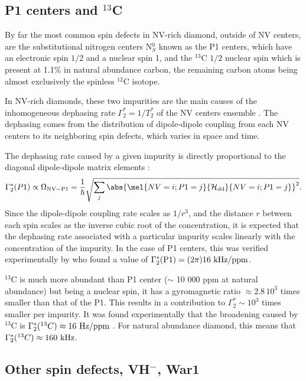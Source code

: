 \documentclass[a4paper]{report}
\begin{document}
\subsection{P1 centers and $^{13}$C}
By far the most common spin defects in NV-rich diamond, outside of NV centers, are the substitutional nitrogen centers N$^0_S$ known as the P1 centers, which have an electronic spin $1/2$ and a nuclear spin 1, and the $^13$C $1/2$ nuclear spin which is present at 1.1\% in natural abundance carbon, the remaining carbon atoms being almost exclusively the spinless $^12$C isotope. 

In NV-rich diamonds, these two impurities are the main causes of the inhomogeneous dephasing rate $\Gamma_2^*=1/T_2^*$ of the NV centers ensemble \citep{barry2020sensitivity}. The dephasing comes from the distribution of dipole-dipole coupling from each NV centers to its neighboring spin defects, which varies in space and time. 

The dephasing rate caused by a given impurity is directly proportional to the diagonal dipole-dipole matrix elements \citep{bauch2020decoherence}: 
\begin{equation}
\Gamma_2^*(P1) \propto \Omega_{\rm NV-P1}=\frac{1}{\hbar}\sqrt{\sum_j \abs{\mel{NV=i;P1=j}{\mathcal{H}_{\rm dd}}{NV=i;P1=j}}^2}.
\label{Gamma2 P1}
\end{equation}
Since the dipole-dipole coupling rate scales as $1/r^3$, and the distance $r$ between each spin scales as the inverse cubic root of the concentration,  it is expected that the dephasing rate associated with a particular impurity scales linearly with the concentration of the impurity. In the case of P1 centers, this was verified experimentally by \citep{bauch2020decoherence} who found a value of $\Gamma_2^*(\rm P1)= (2 \pi) 16\ \rm kHz/ppm$. 

$^{13}$C is much more abundant than P1 center ($\sim$ 10 000 ppm at natural abundance) but being a nuclear spin, it has a gyromagnetic ratio $\approx 2.8\, 10^3$ times smaller than that of the P1. This results in a contribution to $\Gamma_2^* \sim 10^3$ times smaller per impurity. It was found experimentally that the broadening caused by $^13$C is $\Gamma_2^*(^{13}C) \approx 16\ \rm Hz/ppm$ \citep{van1997dependences, barry2020sensitivity}. For natural abundance diamond, this means that $\Gamma_2^*(^{13}C) \approx 160\ \rm kHz$.

\subsection{Other spin defects, VH$^-$, War1}
\end{document}
